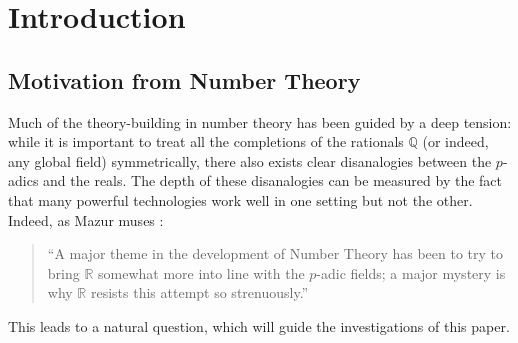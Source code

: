 \documentclass[a4paper, 11pt,reqno]{amsart}
\begin{document}
\begin{abstract} Classically, the places of $\mathbb{Q}$ are often regarded as a one-point compactification of $\mathrm{Spec}(\mathbb{Z})$, with the real place corresponding to a formal ``prime'' added at infinity. Re-examining this picture from a topos-theoretic perspective reveals a subtler geometry: while the non-Archimedean places are identified with singletons indexed by the non-zero prime ideals of $\mathbb{Z}$, the Archimedean place is represented by the space of upper reals  $\overleftarrow{[0,1]}$, which may be informally thought of as the unit interval equipped with a non-Hausdorff topology. 
	
	On a technical level, our analysis brings together geometric logic and descent techniques from topos theory, distinguishing standard descent from lax descent toposes both at the level of sheaves and of the geometric theories they classify. More broadly, this paper brings into conversation two parallel distinctions: on the number-theoretic side, between Archimedean and non-Archimedean phenomena, and on the topos-theoretic side, between standard and lax descent. Looked at from a high level, these perspectives begin to converge on a common theme: how should the connected and the disconnected interact?
\end{abstract}
\maketitle

\section{Introduction}\label{sec:Intro}

\subsection{Motivation from Number Theory}\label{sec:NT-motivation}
 Much of the theory-building in number theory has been guided by a deep tension: while it is important to treat all the completions of the rationals $\mathbb{Q}$ (or indeed, any global field) symmetrically, there also exists clear disanalogies between the $p$-adics and the reals. The depth of these disanalogies can be measured by the fact that many powerful technologies work well in one setting but not the other. Indeed, as Mazur muses \cite{Maz}: 

\begin{quote}``A major theme in the development of Number Theory has been to try to bring $\mathbb{R}$ somewhat more into line with the $p$-adic fields; a major mystery is why $\mathbb{R}$ resists this attempt so strenuously.''
\end{quote}
This leads to a natural question, which will guide the investigations of this paper.
\end{document}
